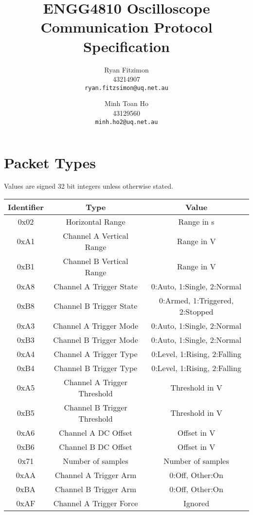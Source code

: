 \documentclass[]{article}
\title{ENGG4810 Oscilloscope Communication Protocol Specification}
\author{
	Ryan Fitzimon\\
	43214907\\
	\texttt{ryan.fitzsimon@uq.net.au}
	\and
	Minh Toan Ho\\
	43129560\\
	\texttt{minh.ho2@uq.net.au}
}
\begin{document}
\maketitle

\section{Packet Types}

Values are signed 32 bit integers unless otherwise stated.

\begin{table}[H]
	\renewcommand{\arraystretch}{1.2}
	\centering
	\begin{tabular}{|c|c|c|}
		\hline
		\textbf{Identifier} & \textbf{Type} & \textbf{Value} \\ \hline
		0x02 & Horizontal Range & Range in \textmu s \\ \hline
		0xA1 & Channel A Vertical Range & Range in \textmu V \\ \hline
		0xB1 & Channel B Vertical Range & Range in \textmu V \\ \hline
		0xA8 & Channel A Trigger State & 0:Auto, 1:Single, 2:Normal \\ \hline
		0xB8 & Channel B Trigger State & 0:Armed, 1:Triggered, 2:Stopped \\ \hline
		0xA3 & Channel A Trigger Mode & 0:Auto, 1:Single, 2:Normal \\ \hline
		0xB3 & Channel B Trigger Mode & 0:Auto, 1:Single, 2:Normal \\ \hline
		0xA4 & Channel A Trigger Type & 0:Level, 1:Rising, 2:Falling \\ \hline
		0xB4 & Channel B Trigger Type & 0:Level, 1:Rising, 2:Falling \\ \hline
		0xA5 & Channel A Trigger Threshold & Threshold in \textmu V \\ \hline
		0xB5 & Channel B Trigger Threshold & Threshold in \textmu V \\ \hline
		0xA6 & Channel A DC Offset & Offset in \textmu V \\ \hline
		0xB6 & Channel B DC Offset & Offset in \textmu V \\ \hline
		0x71 & Number of samples & Number of samples \\ \hline
		0xAA & Channel A Trigger Arm & 0:Off, Other:On \\ \hline 
		0xBA & Channel B Trigger Arm & 0:Off, Other:On \\ \hline 
		0xAF & Channel A Trigger Force & Ignored \\ \hline 

\end{tabular}
\end{table}
\end{document}

